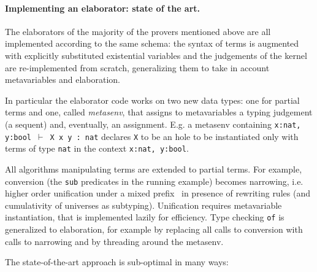 \documentclass{easychair}
\begin{document}
\paragraph{Implementing an elaborator: state of the art.}  %

The elaborators of the majority of the provers mentioned above are all
implemented according to the same schema: the syntax of terms is augmented with
explicitly substituted existential variables
and the judgements of the kernel are re-implemented from scratch, generalizing
them to take in account metavariables and elaboration.

In particular the elaborator code works on two new data types: one for partial terms and one, called \emph{metasenv}, that assigns to metavariables a typing judgement (a sequent) and, eventually, an assignment. E.g. a metasenv containing \verb+x:nat, y:bool +$\vdash$\verb+ X x y : nat+ declares \verb+X+ to be an hole to be instantiated only with terms of type \verb+nat+ in the context \verb+x:nat, y:bool+.

All algorithms manipulating terms are extended to partial
terms. For example, conversion (the \verb+sub+ predicates in the running
example) becomes narrowing, i.e. higher order unification under a
mixed prefix~\cite{mixedprefix} in presence of rewriting rules (and cumulativity of universes as subtyping).
Unification requires metavariable instantiation, that is
implemented lazily for efficiency.  Type checking \verb+of+ is generalized to
elaboration, for example by replacing all calls to conversion with calls to
narrowing and by threading around the metasenv.

The state-of-the-art approach is sub-optimal in many ways:
\end{document}
